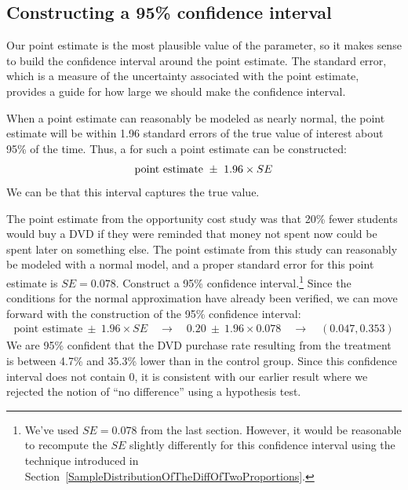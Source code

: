 \subsection{Constructing a 95\% confidence interval}

Our point estimate is the most plausible value of the parameter, so it makes sense to build the confidence interval around the point estimate. The standard error, which is a measure of the uncertainty associated with the point estimate, provides a guide for how large we should make the confidence interval.

\begin{termBox}{
When a point estimate can reasonably be modeled as nearly normal, the point estimate will be within 1.96 standard errors of the true value of interest about 95\% of the time. Thus, a  for such a point estimate can be constructed:\vspace{-2mm}
\begin{align}
\text{point estimate}\ \pm\ 1.96 \times SE\vspace{-1mm}
\label{95PercentConfidenceIntervalFormula}
\end{align}
We can be  that this interval captures the true value.}
\end{termBox}

\begin{example}{The point estimate from the opportunity cost study was that 20\% fewer students would buy a DVD if they were reminded that money not spent now could be spent later on something else. The point estimate from this study can reasonably be modeled with a normal model, and a proper standard error for this point estimate is $SE = 0.078$. Construct a 95\% confidence interval.\footnote{We've used $SE = 0.078$ from the last section. However, it would be reasonable to recompute the $SE$ slightly differently for this confidence interval using the technique introduced in Section~\ref{SampleDistributionOfTheDiffOfTwoProportions}.} }
Since the conditions for the normal approximation have already been verified, we can move forward with the construction of the 95\% confidence interval:
\begin{align*}
\text{point estimate}\ \pm\ 1.96 \times SE \quad \rightarrow \quad
0.20\ \pm\ 1.96 \times 0.078 \quad \rightarrow \quad
(0.047, 0.353)
\end{align*}
We are 95\% confident that the DVD purchase rate resulting from the treatment is between 4.7\% and 35.3\% lower than in the control group. Since this confidence interval does not contain 0, it is consistent with our earlier result where we rejected the notion of ``no difference'' using a hypothesis test.
\end{example}

